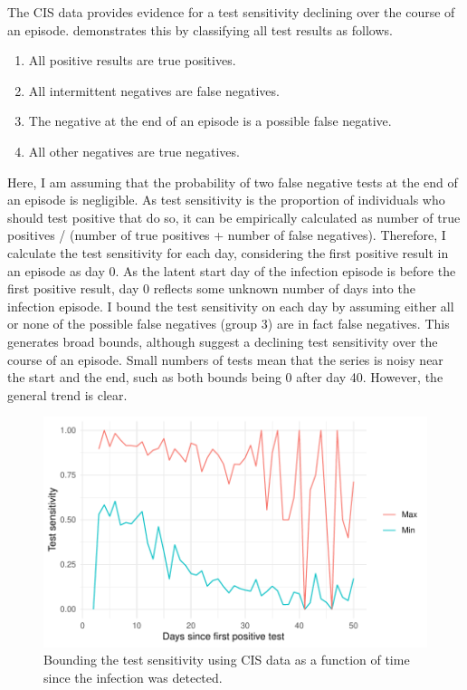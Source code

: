 \documentclass[thesis.tex]{subfiles}
\begin{document}
The CIS data provides evidence for a test sensitivity declining over the course of an episode.
 demonstrates this by classifying all test results as follows.
\begin{enumerate}
    \item All positive results are true positives.
    \item All intermittent negatives are false negatives.
    \item The negative at the end of an episode is a possible false negative.
    \item All other negatives are true negatives.
\end{enumerate}
Here, I am assuming that the probability of two false negative tests at the end of an episode is negligible.
As test sensitivity is the proportion of individuals who should test positive that do so, it can be empirically calculated as number of true positives / (number of true positives + number of false negatives).
Therefore, I calculate the test sensitivity for each day, considering the first positive result in an episode as day 0.
As the latent start day of the infection episode is before the first positive result, day 0 reflects some unknown number of days into the infection episode.
I bound the test sensitivity on each day by assuming either all or none of the possible false negatives (group 3) are in fact false negatives.
This generates broad bounds, although suggest a declining test sensitivity over the course of an episode.
Small numbers of tests mean that the series is noisy near the start and the end, such as both bounds being 0 after day 40.
However, the general trend is clear.
\begin{figure}
  \includegraphics{cis-imperfect-testing/test-sens-bound}
  \caption[Bounding test sensitivity using CIS data]{
    Bounding the test sensitivity using CIS data as a function of time since the infection was detected.
  }
  \label{imperf-test:fig:bounding-cis-sensitivity}
\end{figure}
\end{document}
